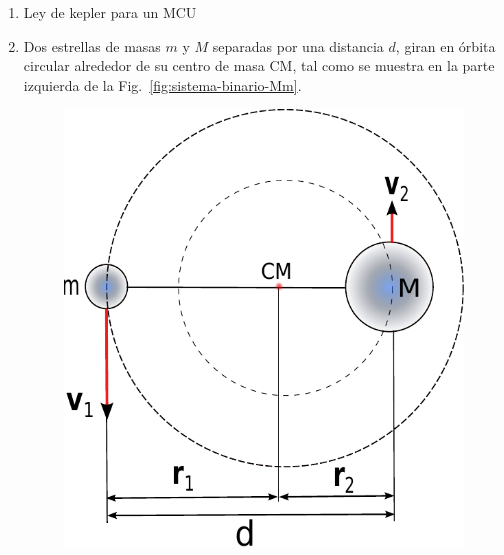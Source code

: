 \begin{enumerate}

\item Ley de kepler para un MCU





\vspace{0.5 cm}
\item Dos estrellas de masas $m$ y $M$ separadas por una distancia $d$, giran en  órbita circular alrededor de su centro de masa CM, tal como se muestra en la parte izquierda de la Fig.~\ref{fig:sistema-binario-Mm}. 
%
\begin{figure}[h]
\begin{center}
\includegraphics[scale=0.6]{gravitacion/sistema-binario-Mm}\hspace{1.0 cm}

\end{center}
\end{figure}
\end{enumerate}
